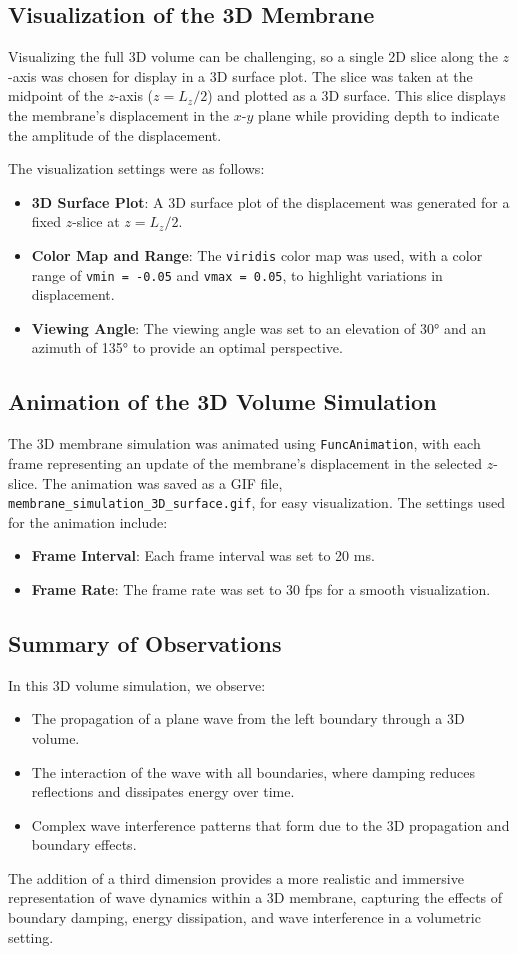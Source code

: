 \documentclass{article}
\begin{document}
\subsection{Visualization of the 3D Membrane}
Visualizing the full 3D volume can be challenging, so a single 2D slice along the $z$-axis was chosen for display in a 3D surface plot. The slice was taken at the midpoint of the $z$-axis ($z = L_z / 2$) and plotted as a 3D surface. This slice displays the membrane's displacement in the $x$-$y$ plane while providing depth to indicate the amplitude of the displacement.

The visualization settings were as follows:
\begin{itemize}
    \item \textbf{3D Surface Plot}: A 3D surface plot of the displacement was generated for a fixed $z$-slice at $z = L_z / 2$.
    \item \textbf{Color Map and Range}: The \texttt{viridis} color map was used, with a color range of \texttt{vmin = -0.05} and \texttt{vmax = 0.05}, to highlight variations in displacement.
    \item \textbf{Viewing Angle}: The viewing angle was set to an elevation of 30° and an azimuth of 135° to provide an optimal perspective.
\end{itemize}

\subsection{Animation of the 3D Volume Simulation}
The 3D membrane simulation was animated using \texttt{FuncAnimation}, with each frame representing an update of the membrane’s displacement in the selected $z$-slice. The animation was saved as a GIF file, \texttt{membrane\_simulation\_3D\_surface.gif}, for easy visualization. The settings used for the animation include:
\begin{itemize}
    \item \textbf{Frame Interval}: Each frame interval was set to 20 ms.
    \item \textbf{Frame Rate}: The frame rate was set to 30 fps for a smooth visualization.
\end{itemize}

\subsection{Summary of Observations}
In this 3D volume simulation, we observe:
\begin{itemize}
    \item The propagation of a plane wave from the left boundary through a 3D volume.
    \item The interaction of the wave with all boundaries, where damping reduces reflections and dissipates energy over time.
    \item Complex wave interference patterns that form due to the 3D propagation and boundary effects.
\end{itemize}

The addition of a third dimension provides a more realistic and immersive representation of wave dynamics within a 3D membrane, capturing the effects of boundary damping, energy dissipation, and wave interference in a volumetric setting.
\end{document}
